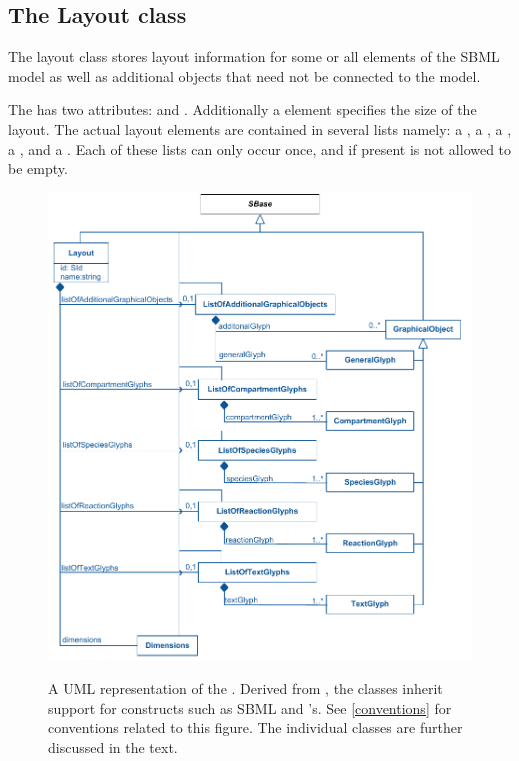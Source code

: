 \subsection{The Layout class}
\label{layout-class}
The layout class stores layout information for some or all elements of 
the SBML model as well as additional objects that need not be connected 
to the model. 

The \LayoutClass has two attributes:  and 
. Additionally a \Dimensions element specifies the size of 
the layout. The actual layout elements are contained in several lists 
namely: a \ListOfCompartmentGlyphs, a \ListOfSpeciesGlyphs, a 
\ListOfReactionGlyphs, a \ListOfTextGlyphs, and a 
\ListOfAdditionalGraphicalObjects. Each of these lists can only occur 
once, and if present is not allowed to be empty. 


\begin{figure}[!h]
\includegraphics{uml/layout-layout-uml}\\
\label{uml:layout}
\label{UML:LAYOUT_CLASSES}
\label{fig:layout_uml}
\caption{A UML representation of the \LayoutPackage. Derived from 
\SBase, the \Layout classes inherit support for constructs such as SBML 
\Notes and \Annotation's. See \ref{conventions} for conventions related 
to this figure. The individual classes are further discussed in the 
text.} 
\end{figure}

